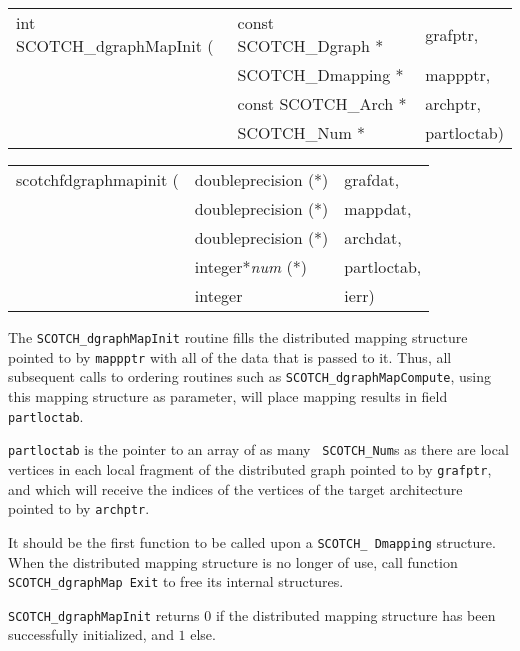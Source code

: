 \begin{itemize}
\progsyn

{\tt\begin{tabular}{l@{}ll}
int SCOTCH\_dgraphMapInit ( & const SCOTCH\_Dgraph * & grafptr, \\
                            & SCOTCH\_Dmapping *     & mappptr, \\
                            & const SCOTCH\_Arch *   & archptr, \\
                            & SCOTCH\_Num *          & partloctab)
\end{tabular}}

{\tt\begin{tabular}{l@{}ll}
scotchfdgraphmapinit ( & doubleprecision (*)   & grafdat,    \\
                       & doubleprecision (*)   & mappdat,    \\
                       & doubleprecision (*)   & archdat,    \\
                       & integer*{\it num} (*) & partloctab, \\
                       & integer               & ierr)
\end{tabular}}

\progdes

The {\tt SCOTCH\_dgraphMapInit} routine fills the distributed mapping
structure pointed to by {\tt mappptr} with all of the data that is
passed to it. Thus, all subsequent calls to ordering routines such as
{\tt SCOTCH\_\lbt dgraph\lbt Map\lbt Compute}, using this mapping
structure as parameter, will place mapping results in field {\tt
part\lbt loc\lbt tab}.

{\tt partloctab} is the pointer to an array of as many {\tt
SCOTCH\_\lbt Num}s as there are local vertices in each local fragment
of the distributed graph pointed to by {\tt grafptr}, and which will
receive the indices of the vertices of the target architecture pointed
to by {\tt archptr}.

It should be the first function to be called upon a {\tt SCOTCH\_\lbt
Dmapping} structure. When the distributed mapping structure is no
longer of use, call function {\tt SCOTCH\_dgraph\lbt \lbt Map\lbt
Exit} to free its internal structures.

\progret

{\tt SCOTCH\_dgraphMapInit} returns $0$ if the distributed mapping
structure has been successfully initialized, and $1$ else.
\end{itemize}

